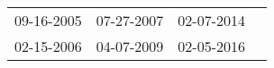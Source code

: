 \begin{supertabular}{llll}
 09-16-2005 &  07-27-2007 &  02-07-2014 \\
 02-15-2006 &  04-07-2009 &  02-05-2016 \\
\end{supertabular}

